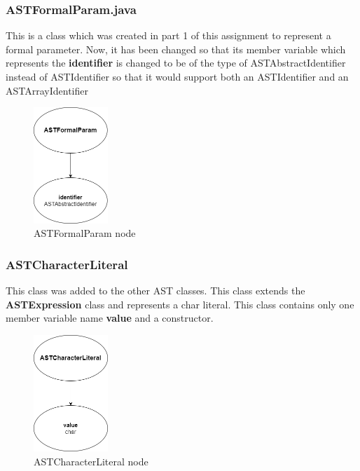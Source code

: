 \documentclass{article}
\begin{document}
						\subsubsection{ASTFormalParam.java}
					
					This is a class which was created in part 1 of this assignment to represent a formal parameter. Now, it has been changed so that its member variable which represents the \textbf{identifier} is changed to be of the type of ASTAbstractIdentifier instead of ASTIdentifier so that it would support both an ASTIdentifier and an ASTArrayIdentifier
					
					\begin{figure}[H]
					\centering
			 			\includegraphics[width=0.25\textwidth]{astformalparam2.png}
			  			\caption{ASTFormalParam node}
			  			\label{fig:astformalparam}
					\end{figure}
					
				\subsubsection{ASTCharacterLiteral}
				
				This class was added to the other AST classes. This class extends the \textbf{ASTExpression} class and represents a char literal. This class contains only one member variable name \textbf{value} and a constructor.
				
				\begin{figure}[H]
					\centering
			 			\includegraphics[width=0.25\textwidth]{ASTCharLiteral.png}
			  			\caption{ASTCharacterLiteral node}
			  			\label{fig:astcharlit}
					\end{figure}
					
\end{document}
